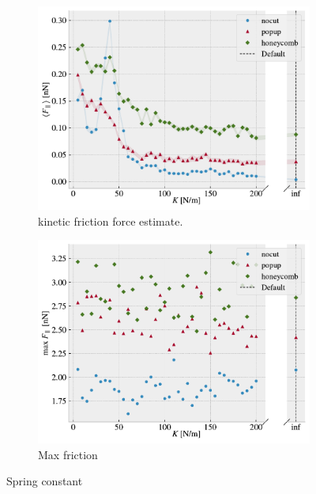 \begin{figure}[H]
  \centering
  \begin{subfigure}[t]{0.49\textwidth}
      \centering
      \includegraphics[width=\textwidth]{figures/baseline/variables_spring_mean_fixmove.pdf}
      \caption{kinetic friction force estimate.}
      \label{fig:var_K_mean}
  \end{subfigure}
  \hfill
  \begin{subfigure}[t]{0.49\textwidth}
      \centering
      \includegraphics[width=\textwidth]{figures/baseline/variables_spring_max_fixmove.pdf}
      \caption{Max friction}
      \label{fig:var_K_max}
  \end{subfigure}
  \hfill
     \caption{Spring constant}
     \label{fig:var_K}
\end{figure}



